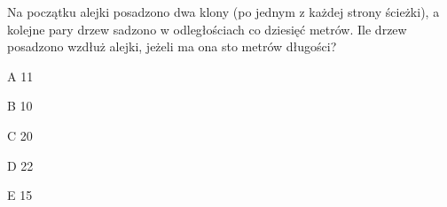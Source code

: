 \begin{tresc}
Na początku alejki posadzono dwa klony (po jednym z każdej strony ścieżki), a kolejne pary drzew sadzono w odległościach co dziesięć metrów. Ile drzew posadzono wzdłuż alejki, jeżeli ma ona sto metrów długości?
\end{tresc}
\begin{wariant}{A} 11 \end{wariant}
\begin{wariant}{B} 10 \end{wariant}
\begin{wariant}{C} 20 \end{wariant}
\begin{wariant}{D} 22 \end{wariant}
\begin{wariant}{E} 15 \end{wariant}
